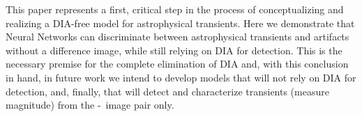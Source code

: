  This paper represents a first, critical step in the process of conceptualizing and realizing a DIA-free model for astrophysical transients. Here we demonstrate that Neural Networks can discriminate between astrophysical transients and artifacts without a difference image, while still relying on DIA for detection. This is the necessary premise for the complete elimination of DIA and, with this conclusion in hand, in future work we intend to develop models that will not rely on DIA for detection, and, finally, that will detect and characterize transients (measure magnitude) from the \temp-\search\ image pair only.






